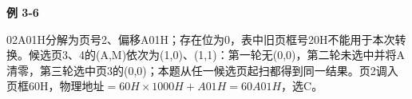 {\color{ink}\bfseries 例 3-6}\par\vspace{1bp}02A01H分解为页号2、偏移A01H；存在位为0，表中旧页框号20H不能用于本次转换。候选页3、4的(A,\allowbreak{}M)依次为(1,\allowbreak{}0)、(1,\allowbreak{}1)：第一轮无(0,\allowbreak{}0)，第二轮未选中并将A清零，第三轮选中页3的(0,\allowbreak{}0)；本题从任一候选页起扫都得到同一结果。页2调入页框60H，物理地址\(=\allowbreak{}60H\times 1000H+\allowbreak{}A01H=\allowbreak{}60A01H\)，选C。

